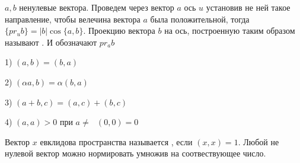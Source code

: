 \begin{defin}
  $a,b$ ненулевые вектора. Проведем через вектор $a$ ось $u$ установив не ней
  такое направление, чтобы велечина вектора $a$ была положительной, тогда
  $\{pr_u b\} = |b|\cos\{a,b\}$. Проекцию вектора $b$ на ось, построенную таким
  образом называют . И обозначают
  $pr_a b$

  1) $(a, b) = (b, a)$

  2) $(\alpha a, b) = \alpha(b,a)$

  3) $(a + b, c) = (a, c) + (b, c)$

  4) $(a, a) > 0$ при $a \not= ~~~ (0,0) = 0$
\end{defin}

\begin{defin}
  Вектор $x$ евклидова пространства называется , если
  $(x,x)=1$. Любой не нулевой вектор можно нормировать умножив на соотвествующее
  число.
\end{defin}